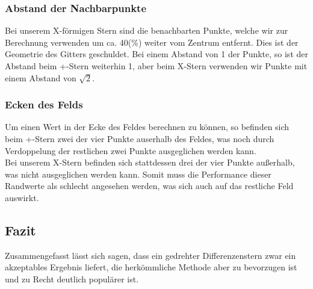\documentclass[twoside,10pt,a4paper]{article}
\numberwithin{equation}{section}					%
\numberwithin{figure}{section}						%
\begin{document}
\subsubsection{Abstand der Nachbarpunkte}
Bei unserem X-förmigen Stern sind die benachbarten Punkte, welche wir zur Berechnung verwenden um ca. 40(\%) weiter vom Zentrum entfernt. Dies ist der Geometrie des Gitters geschuldet. Bei einem Abstand von 1 der Punkte, so ist der Abstand beim +-Stern weiterhin 1, aber beim X-Stern verwenden wir Punkte mit einem Abstand von $\sqrt{2}$.
\subsubsection{Ecken des Felds}
Um einen Wert in der Ecke des Feldes berechnen zu können, so befinden sich beim +-Stern zwei der vier Punkte auserhalb des Feldes, was noch durch Verdoppelung der restlichen zwei Punkte ausgeglichen werden kann.\\
Bei unserem X-Stern befinden sich stattdessen drei der vier Punkte außerhalb, was nicht ausgeglichen werden kann. Somit muss die Performance dieser Randwerte als schlecht angesehen werden, was sich auch auf das restliche Feld auswirkt.
\subsection{Fazit}
Zusammengefasst lässt sich sagen, dass ein gedrehter Differenzenstern zwar ein akzeptables Ergebnis liefert, die herkömmliche Methode aber zu bevorzugen ist und zu Recht deutlich populärer ist.
\end{document}
